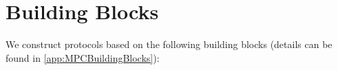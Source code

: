 



\section{Building Blocks}
\label{sec:MPCBuildingBlocks}
We construct \smpc protocols based on the following building blocks (details can be found in \autoref{app:MPCBuildingBlocks}):

